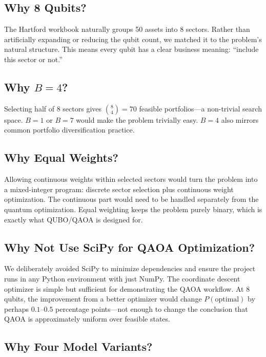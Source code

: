 \documentclass[12pt, a4paper]{article}
\begin{document}
\subsection{Why 8 Qubits?}

The Hartford workbook naturally groups 50 assets into 8 sectors. Rather than
artificially expanding or reducing the qubit count, we matched it to the
problem's natural structure. This means every qubit has a clear business
meaning: ``include this sector or not.''

\subsection{Why $B = 4$?}

Selecting half of 8 sectors gives $\binom{8}{4} = 70$ feasible portfolios---a
non-trivial search space. $B = 1$ or $B = 7$ would make the problem trivially
easy. $B = 4$ also mirrors common portfolio diversification practice.

\subsection{Why Equal Weights?}

Allowing continuous weights within selected sectors would turn the problem into
a mixed-integer program: discrete sector selection plus continuous weight
optimization. The continuous part would need to be handled separately from the
quantum optimization. Equal weighting keeps the problem purely binary, which
is exactly what QUBO/QAOA is designed for.

\subsection{Why Not Use SciPy for QAOA Optimization?}

We deliberately avoided SciPy to minimize dependencies and ensure the project
runs in any Python environment with just NumPy. The coordinate descent
optimizer is simple but sufficient for demonstrating the QAOA workflow. At
8 qubits, the improvement from a better optimizer would change $P(\text{optimal})$
by perhaps $0.1$--$0.5$ percentage points---not enough to change the conclusion
that QAOA is approximately uniform over feasible states.

\subsection{Why Four Model Variants?}
\end{document}
